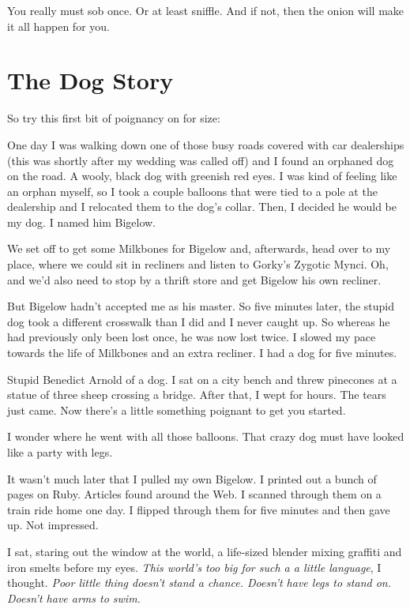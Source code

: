\documentclass[10pt,twoside]{report}
\begin{document}
You really must sob once.  Or at least sniffle.  And if not, then the
onion will make it all happen for you.


\section{The Dog Story}


So try this first bit of poignancy on for size:

One day I was walking down one of those busy roads covered with car
dealerships (this was shortly after my wedding was called off) and I
found an orphaned dog on the road.  A wooly, black dog with greenish
red eyes.  I was kind of feeling like an orphan myself, so I took a
couple balloons that were tied to a pole at the dealership and I
relocated them to the dog's collar.  Then, I decided he would be my
dog.  I named him Bigelow.

We set off to get some Milkbones for Bigelow and, afterwards, head
over to my place, where we could sit in recliners and listen to
Gorky's Zygotic Mynci.  Oh, and we'd also need to stop by a thrift
store and get Bigelow his own recliner.

But Bigelow hadn't accepted me as his master.  So five minutes later,
the stupid dog took a different crosswalk than I did and I never
caught up.  So whereas he had previously only been lost once, he was
now lost twice.  I slowed my pace towards the life of Milkbones and an
extra recliner.  I had a dog for five minutes.

Stupid Benedict Arnold of a dog.  I sat on a city bench and threw
pinecones at a statue of three sheep crossing a bridge.  After that, I
wept for hours.  The tears just came.  Now there's a little something
poignant to get you started.

I wonder where he went with all those balloons.  That crazy dog must
have looked like a party with legs.

It wasn't much later that I pulled my own Bigelow.  I printed out a
bunch of pages on Ruby.  Articles found around the Web.  I scanned
through them on a train ride home one day.  I flipped through them for
five minutes and then gave up.  Not impressed.

I sat, staring out the window at the world, a life-sized blender
mixing graffiti and iron smelts before my eyes.  {\em This world's too
  big for such a a little language}, I thought. {\em Poor little thing
  doesn't stand a chance.  Doesn't have legs to stand on.  Doesn't
  have arms to swim.}
\end{document}
